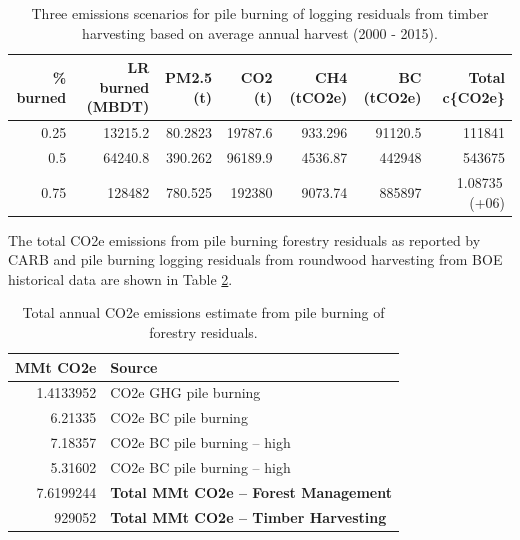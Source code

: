 \documentclass[a4paper,titlepage]{article}
\begin{document}
\begin{table}[htb]
\centering
\begin{tabular}{rrrrrrr}
\% burned & LR burned (MBDT) & PM2.5 (t) & CO2 (t) & CH4 (tCO2e) & BC (tCO2e) & Total c\{CO2e\}\\
\hline
0.25 & 13215.2 & 80.2823 & 19787.6 & 933.296 & 91120.5 & 111841\\
0.5 & 64240.8 & 390.262 & 96189.9 & 4536.87 & 442948 & 543675\\
0.75 & 128482 & 780.525 & 192380 & 9073.74 & 885897 & 1.08735\,(+06)\\
\end{tabular}
\caption{\label{tab:orgtable3}
Three emissions scenarios for pile burning of logging residuals from timber harvesting based on average annual harvest (2000 - 2015).}

\end{table}


The total \ac{CO2e} emissions from pile burning forestry residuals as reported by \ac{CARB} and pile burning logging residuals from roundwood harvesting from \ac{BOE} historical data are shown in Table \ref{tab:piles}.


\begin{table}[htb]
\centering
\begin{tabular}{rl}
MMt CO2e & Source\\
\hline
1.4133952 & \ac{CO2e} \ac{GHG} pile burning\\
6.21335 & \ac{CO2e} \ac{BC}  pile burning\\
7.18357 & \ac{CO2e} \ac{BC}  pile burning  -- high\\
5.31602 & \ac{CO2e} \ac{BC}  pile burning  -- high\\
\hline
7.6199244 & \textbf{Total MMt CO2e -- Forest Management}\\
929052 & \textbf{Total MMt CO2e -- Timber Harvesting}\\
\end{tabular}
\caption{\label{tab:orgtable4}
Total annual \ac{CO2e} emissions estimate from pile burning of forestry residuals. \label{tab:piles}}

\end{table}
\end{document}
